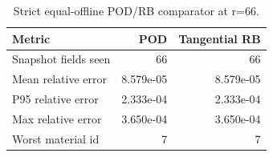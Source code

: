 \begin{table}
\centering
\small
\caption{Strict equal-offline POD/RB comparator at r=66.}
\label{tab:pod}
\begin{tabular}{lrr}
\toprule
Metric & POD & Tangential RB \\
\midrule
Snapshot fields seen & 66 & 66 \\
Mean relative error & 8.579e-05 & 8.579e-05 \\
P95 relative error & 2.333e-04 & 2.333e-04 \\
Max relative error & 3.650e-04 & 3.650e-04 \\
Worst material id & 7 & 7 \\
\bottomrule
\end{tabular}
\end{table}
